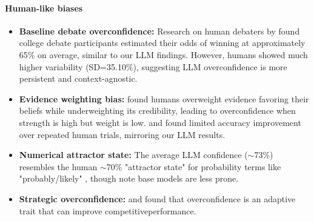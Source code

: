 \documentclass{article}
\begin{document}
\paragraph{Human-like biases}
\begin{itemize}
    \item \textbf{Baseline debate overconfidence:} Research on human debaters by \citet{RePEc:sip:dpaper:06-042} found college debate participants estimated their odds of winning at approximately 65\% on average, similar to our LLM findings. However, humans showed much higher variability (SD=35.10\%), suggesting LLM overconfidence is more persistent and context-agnostic.

    \item \textbf{Evidence weighting bias:} \citet{GriffinTversky1992} found humans overweight evidence favoring their beliefs while underweighting its credibility, leading to overconfidence when strength is high but weight is low. \citet{Moore2008} and \citet{RePEc:sip:dpaper:06-042} found limited accuracy improvement over repeated human trials, mirroring our LLM results.

    \item \textbf{Numerical attractor state:} The average LLM confidence ($\sim$73\%) resembles the human $\sim$70\% "attractor state" for probability terms like "probably/likely" \citep{Hashim2024,Mandel2019}, though \citep{west2025basemodelsbeataligned,openai2024gpt4technicalreport} note base models are less prone.
    \item \textbf{Strategic overconfidence:} \citet{Johnson_2011} and \citet{priscilla2022overconfidence} found that overconfidence is an adaptive trait that can improve competitiveperformance.
\end{itemize}
\end{document}
